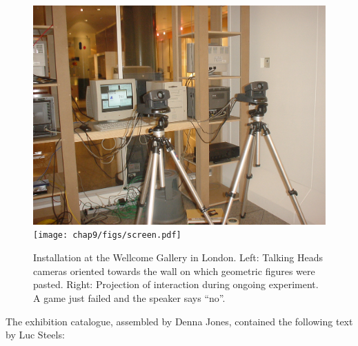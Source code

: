 \begin{figure}[htbp]
  \centerline{\includegraphics[width=.55\textwidth]{chap9/figs/london-heads.pdf} 
\texttt{[image: chap9/figs/screen.pdf]}}
\caption{\label{fig:london-heads}Installation at the Wellcome Gallery in London. Left: Talking Heads cameras oriented towards the wall on which 
geometric figures were pasted. Right: Projection of interaction during ongoing experiment. A game just failed and 
the speaker says ``no''.} 
\end{figure}

The exhibition catalogue, assembled by Denna Jones, contained the following text by Luc Steels: 

